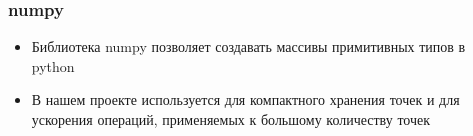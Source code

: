 \begin{frame}\frametitle{numpy}
    \begin{itemize}
	\item Библиотека numpy позволяет создавать массивы примитивных типов в python
        \item В нашем проекте используется для компактного хранения точек и для ускорения операций, применяемых к большому количеству точек
    \end{itemize}
\end{frame}